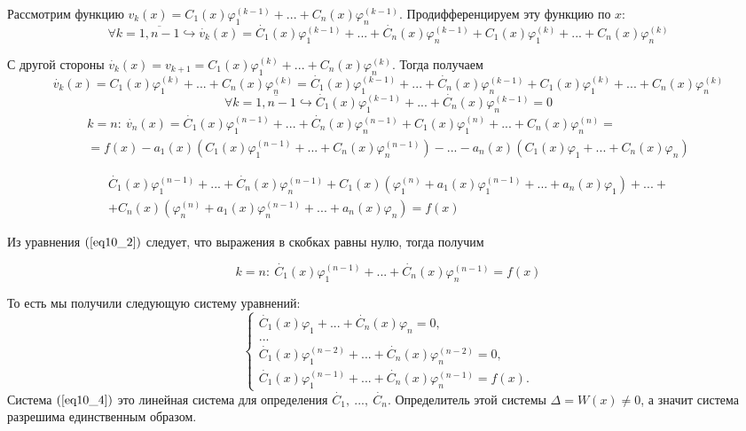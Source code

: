 Рассмотрим функцию $v_k(x) = C_1(x)\varphi_1^{(k-1)} + ... + C_n(x)\varphi_n^{(k-1)}$. Продифференцируем эту функцию по $x$:
\begin{equation}
\forall k =\overline{1, n-1} \hookrightarrow \dot{v_k}(x) = \dot{C_1}(x)\varphi_1^{(k-1)} + ... + \dot{C_n}(x)\varphi_n^{(k-1)} + C_1(x)\varphi_1^{(k)} + ... + C_n(x)\varphi_n^{(k)}
\end{equation}

С другой стороны $\dot{v_k}(x) = v_{k+1} = C_1(x)\varphi_1^{(k)} + ... + C_n(x)\varphi_n^{(k)}$. Тогда получаем
\begin{equation}
\dot{v_k}(x) = C_1(x)\varphi_1^{(k)} + ... + C_n(x)\varphi_n^{(k)} = \dot{C_1}(x)\varphi_1^{(k-1)} + ... + \dot{C_n}(x)\varphi_n^{(k-1)} + C_1(x)\varphi_1^{(k)} + ... + C_n(x)\varphi_n^{(k)}
\end{equation}
\begin{equation}
\forall k =\overline{1, n-1} \hookrightarrow \dot{C_1}(x)\varphi_1^{(k-1)} + ... + \dot{C_n}(x)\varphi_n^{(k-1)} = 0
\end{equation}
\begin{eqnarray*}
k = n: ~\dot{v_n}(x) = \dot{C_1}(x)\varphi_1^{(n-1)} + ... + \dot{C_n}(x)\varphi_n^{(n-1)} + C_1(x)\varphi_1^{(n)} + ... + C_n(x)\varphi_n^{(n)} = \\ = f(x) - a_1(x)\left(C_1(x)\varphi_1^{(n-1)} + ... + C_n(x)\varphi_n^{(n-1)}\right) - ... - a_n(x)\left(C_1(x)\varphi_1 + ... + C_n(x)\varphi_n\right)
\end{eqnarray*}

\begin{eqnarray*}
\dot{C_1}(x)\varphi_1^{(n-1)} + ... + \dot{C_n}(x)\varphi_n^{(n-1)} + C_1(x)\left(\varphi_1^{(n)} + a_1(x)\varphi_1^{(n-1)} + ... + a_n(x)\varphi_1\right) + ... + \\ + C_n(x)\left(\varphi_n^{(n)} + a_1(x)\varphi_n^{(n-1)} + ... + a_n(x)\varphi_n\right) = f(x)
\end{eqnarray*}

Из уравнения $(\ref{eq10_2})$ следует, что выражения в скобках равны нулю, тогда получим

\[k = n: ~\dot{C_1}(x)\varphi_1^{(n-1)} + ... + \dot{C_n}(x)\varphi_n^{(n-1)} = f(x)\]

То есть мы получили следующую систему уравнений:
\begin{equation}\label{eq10_4}
 \begin{cases}
   \dot{C_1}(x)\varphi_1 + ... + \dot{C_n}(x)\varphi_n = 0, 
   \\
   ...
   \\
   \dot{C_1}(x)\varphi_1^{(n-2)} + ... + \dot{C_n}(x)\varphi_n^{(n-2)} = 0,
   \\
   \dot{C_1}(x)\varphi_1^{(n-1)} + ... + \dot{C_n}(x)\varphi_n^{(n-1)} = f(x).
 \end{cases}
\end{equation}
Система $(\ref{eq10_4})$ это линейная система для определения $\dot{C_1}, ~..., ~\dot{C_n}$.
Определитель этой системы $\Delta = W(x) \neq 0$, а значит система разрешима единственным образом.

